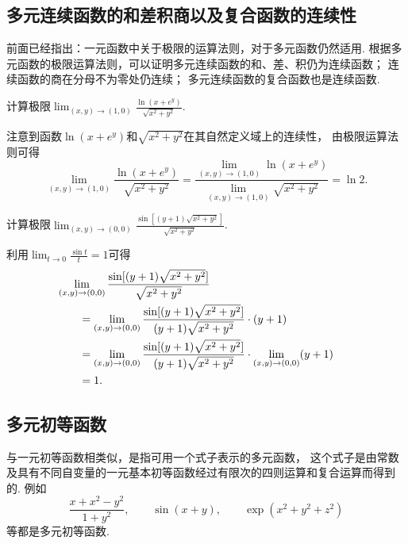 \subsection{多元连续函数的和差积商以及复合函数的连续性}
前面已经指出：一元函数中关于极限的运算法则，对于多元函数仍然适用.
根据多元函数的极限运算法则，可以证明多元连续函数的和、差、积仍为连续函数；
连续函数的商在分母不为零处仍连续；
多元连续函数的复合函数也是连续函数.

\begin{example}
计算极限\(\lim_{(x,y)\to(1,0)} \frac{\ln(x+e^y)}{\sqrt{x^2+y^2}}\).
\begin{solution}
注意到函数\(\ln(x+e^y)\)和\(\sqrt{x^2+y^2}\)在其自然定义域上的连续性，
由极限运算法则可得\begin{equation*}
	\lim_{(x,y)\to(1,0)} \frac{\ln(x+e^y)}{\sqrt{x^2+y^2}}
	= \frac{\lim\limits_{(x,y)\to(1,0)} \ln(x+e^y)}
		{\lim\limits_{(x,y)\to(1,0)} \sqrt{x^2+y^2}}
	= \ln2.
\end{equation*}
\end{solution}
\end{example}
\begin{example}
计算极限\(\lim_{(x,y)\to(0,0)} \frac{\sin[(y+1)\sqrt{x^2+y^2}]}{\sqrt{x^2+y^2}}\).
\begin{solution}
利用\(\lim_{t\to0} \frac{\sin t}{t} = 1\)可得\begin{align*}
	&\hspace{-20pt}
	\lim_{(x,y)\to(0,0)} \frac{\sin[(y+1)\sqrt{x^2+y^2}]}{\sqrt{x^2+y^2}} \\
	&= \lim_{(x,y)\to(0,0)} \frac{\sin[(y+1)\sqrt{x^2+y^2}]}{(y+1)\sqrt{x^2+y^2}}\cdot(y+1) \\
	&= \lim_{(x,y)\to(0,0)} \frac{\sin[(y+1)\sqrt{x^2+y^2}]}{(y+1)\sqrt{x^2+y^2}}
		\cdot \lim_{(x,y)\to(0,0)} (y+1) \\
	&= 1.
\end{align*}
\end{solution}
\end{example}

\subsection{多元初等函数}
与一元初等函数相类似，是指可用一个式子表示的多元函数，
这个式子是由常数及具有不同自变量的一元基本初等函数经过有限次的四则运算和复合运算而得到的.
例如\begin{equation*}
	\frac{x+x^2-y^2}{1+y^2},
	\qquad
	\sin(x+y),
	\qquad
	\exp(x^2+y^2+z^2)
\end{equation*}等都是多元初等函数.

